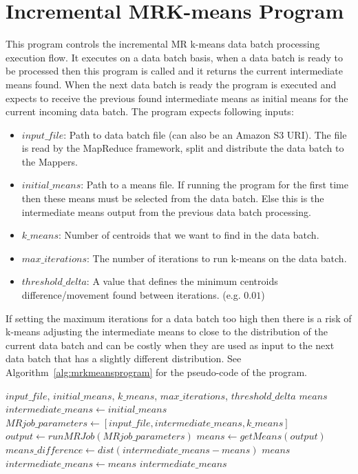 \section{Incremental MRK-means Program}
This program controls the incremental MR k-means data batch processing execution flow. It executes on a data batch basis, when a data batch is ready to be processed then this program is called and it returns the current intermediate means found. When the next data batch is ready the program is executed and expects to receive the previous found intermediate means as initial means for the current incoming data batch. The program expects following inputs:
\begin{itemize}
\item $input\_file$: Path to data batch file (can also be an Amazon S3 URI). The file is read by the MapReduce framework, split and distribute the data batch to the Mappers.
\item $initial\_means$: Path to a means file. If running the program for the first time then these means must be selected from the data batch. Else this is the intermediate means output from the previous data batch processing.
\item $k\_means$: Number of centroids that we want to find in the data batch.
\item $max\_iterations$: The number of iterations to run k-means on the data batch.
\item $threshold\_delta$: A value that defines the minimum centroids difference/movement found between iterations. (e.g. $0.01$)
\end{itemize}

If setting the maximum iterations for a data batch too high then there is a risk of k-means adjusting the intermediate means to close to the distribution of the current data batch and can be costly when they are used as input to the next data batch that has a slightly different distribution. See Algorithm~\ref{alg:mrkmeansprogram} for the pseudo-code of the program.


\begin{center}
\newcommand{\map}{\ensuremath{\mbox{\sc IncrementalMapReduceKmeans}}}
\begin{algorithm}[h!]
\caption{$\map()$}\label{alg:mrkmeansprogram}
\begin{algorithmic}[1]
\REQUIRE $input\_file$, $initial\_means$, $k\_means$, $max\_iterations$, $threshold\_delta$
\ENSURE $means$
\medskip
\STATE $intermediate\_means \leftarrow initial\_means$
	\STATE $MRjob\_parameters \leftarrow [input\_file, intermediate\_means, k\_means]$
	\STATE $output \leftarrow run MRJob(MRjob\_parameters)$
	\STATE $means \leftarrow getMeans(output)$
	\medskip
	\STATE $means\_difference \leftarrow dist(intermediate\_means - means)$
		\RETURN $means$
	\ELSE
		\STATE $intermediate\_means \leftarrow means$
	\ENDIF
\ENDFOR
\medskip
\RETURN $intermediate\_means$
\end{algorithmic}
\end{algorithm}
\end{center}


